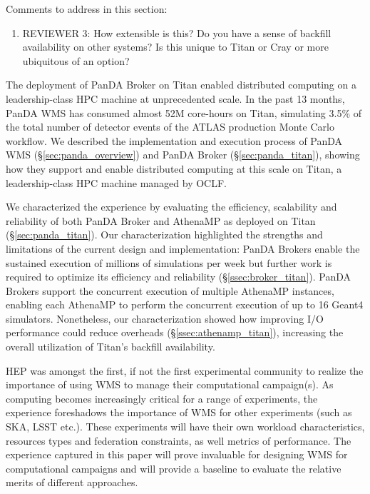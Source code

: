 \ifreview
Comments to address in this section:
\begin{enumerate}
	\item REVIEWER 3: How extensible is this? Do you have a sense of backfill
	availability on other systems? Is this unique to Titan or Cray or more
	ubiquitous of an option?
\end{enumerate}
\fi

The deployment of PanDA Broker on Titan enabled distributed computing on a
leadership-class HPC machine at unprecedented scale. In the past 13 months,
PanDA WMS has consumed almost 52M core-hours on Titan, simulating 3.5\% of
the total number of detector events of the ATLAS production Monte Carlo
workflow. We described the implementation and execution process of PanDA WMS
(\S\ref{sec:panda_overview}) and PanDA Broker (\S\ref{sec:panda_titan}),
showing how they support and enable distributed computing at this scale on
Titan, a leadership-class HPC machine managed by OCLF.

We characterized the experience by evaluating the efficiency, scalability and
reliability of both PanDA Broker and AthenaMP as deployed on Titan
(\S\ref{sec:panda_titan}). Our characterization highlighted the strengths and
limitations of the current design and implementation: PanDA Brokers enable
the sustained execution of millions of simulations per week but further work
is required to optimize its efficiency and reliability
(\S\ref{ssec:broker_titan}). PanDA Brokers support the concurrent execution
of multiple AthenaMP instances, enabling each AthenaMP to perform the
concurrent execution of up to 16 Geant4 simulators. Nonetheless, our
characterization showed how improving I/O performance could reduce overheads
(\S\ref{ssec:athenamp_titan}), increasing the overall utilization of Titan's
backfill availability.


HEP was amongst the first, if not the first experimental community to realize
the importance of using WMS to manage their computational campaign(s). As
computing becomes increasingly critical for a range of experiments, the
experience foreshadows the importance of WMS for other experiments (such as
SKA, LSST etc.).  These experiments will have their own workload
characteristics, resources types and federation constraints, as well metrics
of performance. The experience captured in this paper will prove invaluable
for designing WMS for computational campaigns and will provide a baseline to
evaluate the relative merits of different approaches.

